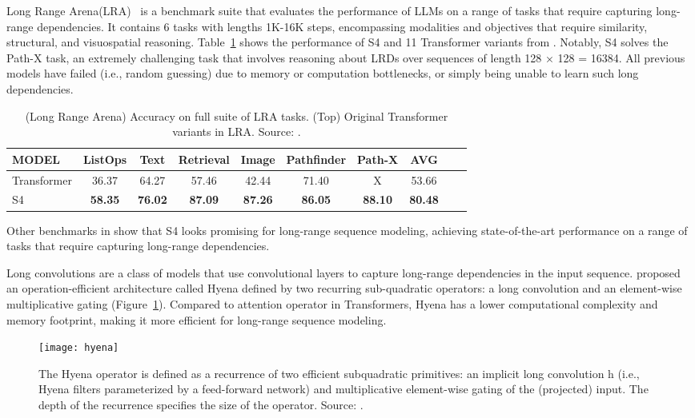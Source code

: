Long Range Arena(LRA)~\cite{tay2021longrange} is a benchmark suite that evaluates the performance of LLMs on a range of tasks that require capturing long-range dependencies.
It contains 6 tasks with lengths 1K-16K steps, encompassing modalities and objectives that require similarity, structural, and visuospatial reasoning.
Table~\ref{tab:LRA} shows the performance of S4 and 11 Transformer variants from \textcite{tay2021longrange}.
Notably, S4 solves the Path-X task, an extremely challenging task that involves reasoning about LRDs over sequences of length 128 × 128 = 16384.
All previous models have failed (i.e., random guessing) due to memory or computation bottlenecks, or simply being unable to learn such long dependencies.
\begin{table}[htbp]
	\centering
	\begin{tabularx}{\textwidth}{Xccccccccc}
		\toprule
		MODEL       & ListOps        & Text           & Retrieval      & Image          & Pathfinder     & Path-X         & AVG            \\
		\midrule
		Transformer & 36.37          & 64.27          & 57.46          & 42.44          & 71.40          & X              & 53.66          \\
		\addlinespace
		S4          & \textbf{58.35} & \textbf{76.02} & \textbf{87.09} & \textbf{87.26} & \textbf{86.05} & \textbf{88.10} & \textbf{80.48} \\
		\bottomrule
	\end{tabularx}
	\caption{(Long Range Arena) Accuracy on full suite of LRA tasks. (Top) Original Transformer variants in LRA. Source: \textcite{gu2022efficiently}.}
	\label{tab:LRA}
\end{table}
Other benchmarks in \textcite{gu2022efficiently} show that S4 looks promising for long-range sequence modeling, achieving state-of-the-art performance on a range of tasks that require capturing long-range dependencies.

Long convolutions are a class of models that use convolutional layers to capture long-range dependencies in the input sequence. \textcite{poli2023hyena} proposed an operation-efficient architecture called Hyena defined by two recurring sub-quadratic operators: a long convolution and an element-wise multiplicative gating (Figure~\ref{fig:hyena}).
Compared to attention operator in Transformers, Hyena has a lower computational complexity and memory footprint, making it more efficient for long-range sequence modeling.

\begin{figure}[h]
	\centering
	\texttt{[image: hyena]}
	\caption{The Hyena operator is defined as a recurrence of two efficient subquadratic primitives: an implicit long convolution h (i.e., Hyena filters parameterized by a feed-forward network) and multiplicative element-wise gating of the (projected) input. The depth of the recurrence specifies the size of the operator. Source: \textcite{poli2023hyena}.}
	\label{fig:hyena}
\end{figure}